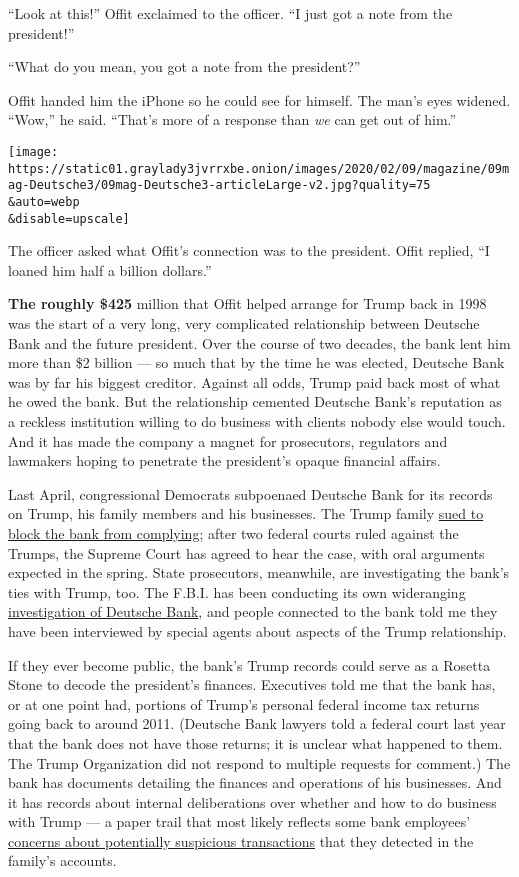``Look at this!'' Offit exclaimed to the officer. ``I just got a note
from the president!''

``What do you mean, you got a note from the president?''

Offit handed him the iPhone so he could see for himself. The man's eyes
widened. ``Wow,'' he said. ``That's more of a response than \emph{we}
can get out of him.''

\texttt{[image: https://static01.graylady3jvrrxbe.onion/images/2020/02/09/magazine/09mag-Deutsche3/09mag-Deutsche3-articleLarge-v2.jpg?quality=75\\\&auto=webp\\\&disable=upscale]}

The officer asked what Offit's connection was to the president. Offit
replied, ``I loaned him half a billion dollars.''

\textbf{The roughly \$425} million that Offit helped arrange for Trump
back in 1998 was the start of a very long, very complicated relationship
between ­Deutsche Bank and the future president. Over the course of two
decades, the bank lent him more than \$2 billion --- so much that by the
time he was elected, ­Deutsche Bank was by far his biggest creditor.
Against all odds, Trump paid back most of what he owed the bank. But the
relationship cemented ­Deutsche Bank's reputation as a reckless
institution willing to do business with clients nobody else would touch.
And it has made the company a magnet for prosecutors, regulators and
lawmakers hoping to penetrate the president's opaque financial affairs.

Last April, congressional Democrats subpoenaed ­Deutsche Bank for its
records on Trump, his family members and his businesses. The Trump
family
\href{https://www.nytimes3xbfgragh.onion/2019/12/03/business/trump-deutsche-bank-subpoena.html}{sued
to block the bank from complying}; after two federal courts ruled
against the Trumps, the Supreme Court has agreed to hear the case, with
oral arguments expected in the spring. State prosecutors, meanwhile, are
investigating the bank's ties with Trump, too. The F.B.I. has been
conducting its own wide­ranging
\href{https://www.nytimes3xbfgragh.onion/2019/06/19/business/deutsche-bank-money-laundering-trump.html}{investigation
of ­Deutsche Bank}, and people connected to the bank told me they have
been interviewed by special agents about aspects of the Trump
relationship.

If they ever become public, the bank's Trump records could serve as a
Rosetta Stone to decode the president's finances. Executives told me
that the bank has, or at one point had, portions of Trump's personal
federal income tax returns going back to around 2011. (Deutsche Bank
lawyers told a federal court last year that the bank does not have those
returns; it is unclear what happened to them. The Trump Organization did
not respond to multiple requests for comment.) The bank has documents
detailing the finances and operations of his businesses. And it has
records about internal deliberations over whether and how to do business
with Trump --- a paper trail that most likely reflects some bank
employees'
\href{https://www.nytimes3xbfgragh.onion/2019/05/19/business/deutsche-bank-trump-kushner.html}{concerns
about potentially suspicious transactions} that they detected in the
family's accounts.

